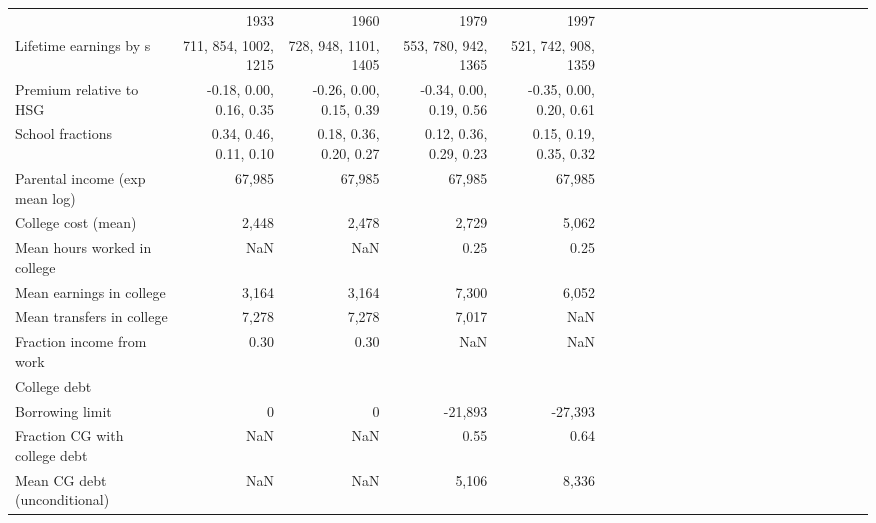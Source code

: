 \begin{tabular}{lrrrrrrrrrrrrrrrrrrrrrrr}
\hline
 & 1933  & 1960  & 1979  & 1997  &   &   &   &   &   &   &   &   &   &   &   &   &   &   &   &   &   &   &   \\ 
Lifetime earnings by s & 711, 854, 1002, 1215  & 728, 948, 1101, 1405  & 553, 780, 942, 1365  & 521, 742, 908, 1359  &   &   &   &   &   &   &   &   &   &   &   &   &   &   &   &   &   &   &   \\ 
Premium relative to HSG & -0.18, 0.00, 0.16, 0.35  & -0.26, 0.00, 0.15, 0.39  & -0.34, 0.00, 0.19, 0.56  & -0.35, 0.00, 0.20, 0.61  &   &   &   &   &   &   &   &   &   &   &   &   &   &   &   &   &   &   &   \\ 
School fractions & 0.34, 0.46, 0.11, 0.10  & 0.18, 0.36, 0.20, 0.27  & 0.12, 0.36, 0.29, 0.23  & 0.15, 0.19, 0.35, 0.32  &   &   &   &   &   &   &   &   &   &   &   &   &   &   &   &   &   &   &   \\ 
Parental income (exp mean log) & 67,985  & 67,985  & 67,985  & 67,985  &   &   &   &   &   &   &   &   &   &   &   &   &   &   &   &   &   &   &   \\ 
College cost (mean) & 2,448  & 2,478  & 2,729  & 5,062  &   &   &   &   &   &   &   &   &   &   &   &   &   &   &   &   &   &   &   \\ 
Mean hours worked in college & NaN  & NaN  & 0.25  & 0.25  &   &   &   &   &   &   &   &   &   &   &   &   &   &   &   &   &   &   &   \\ 
Mean earnings in college & 3,164  & 3,164  & 7,300  & 6,052  &   &   &   &   &   &   &   &   &   &   &   &   &   &   &   &   &   &   &   \\ 
Mean transfers in college & 7,278  & 7,278  & 7,017  & NaN  &   &   &   &   &   &   &   &   &   &   &   &   &   &   &   &   &   &   &   \\ 
Fraction income from work & 0.30  & 0.30  & NaN  & NaN  &   &   &   &   &   &   &   &   &   &   &   &   &   &   &   &   &   &   &   \\ 
College debt &   &   &   &   &   &   &   &   &   &   &   &   &   &   &   &   &   &   &   &   &   &   &   \\ 
Borrowing limit & 0  & 0  & -21,893  & -27,393  &   &   &   &   &   &   &   &   &   &   &   &   &   &   &   &   &   &   &   \\ 
Fraction CG with college debt & NaN  & NaN  & 0.55  & 0.64  &   &   &   &   &   &   &   &   &   &   &   &   &   &   &   &   &   &   &   \\ 
Mean CG debt (unconditional) & NaN  & NaN  & 5,106  & 8,336  &   &   &   &   &   &   &   &   &   &   &   &   &   &   &   &   &   &   &   \\ 
\hline
\end{tabular}%

